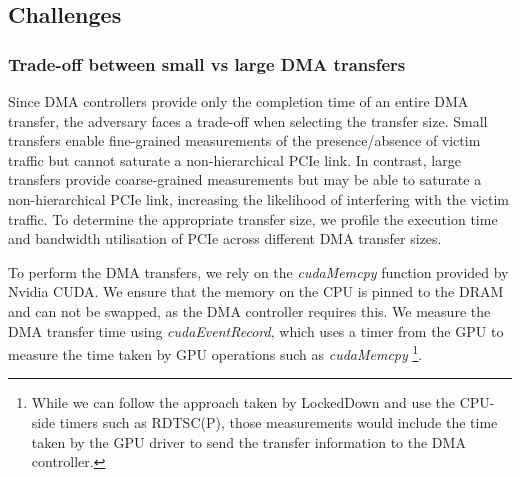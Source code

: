 \subsection{Challenges}
\label{subsec:interconnect-sc-dma-challenges}

\subsubsection{Trade-off between small vs large DMA transfers}
\label{subsubsec:interconnect-sc-dma-challenges-trade-off-small-v-large-tx}

Since DMA controllers provide only the completion time of an entire DMA transfer, the adversary faces a trade-off when selecting the transfer size. 
Small transfers enable fine-grained measurements of the presence/absence of victim traffic but cannot saturate a non-hierarchical PCIe link. 
In contrast, large transfers provide coarse-grained measurements but may be able to saturate a non-hierarchical PCIe link, increasing the likelihood of interfering with the victim traffic.
To determine the appropriate transfer size, we profile the execution time and bandwidth utilisation of PCIe across different DMA transfer sizes.

To perform the DMA transfers, we rely on the \textit{cudaMemcpy} function provided by Nvidia CUDA.
We ensure that the memory on the CPU is pinned to the DRAM and can not be swapped, as the DMA controller requires this.
We measure the DMA transfer time using \textit{cudaEventRecord}, which uses a timer from the GPU to measure the time taken by GPU operations such as \textit{cudaMemcpy}
\footnote{While we can follow the approach taken by LockedDown \cite{side2022lockeddown} and use the CPU-side timers such as RDTSC(P), those measurements would include the time taken by the GPU driver to send the transfer information to the DMA controller.}.


